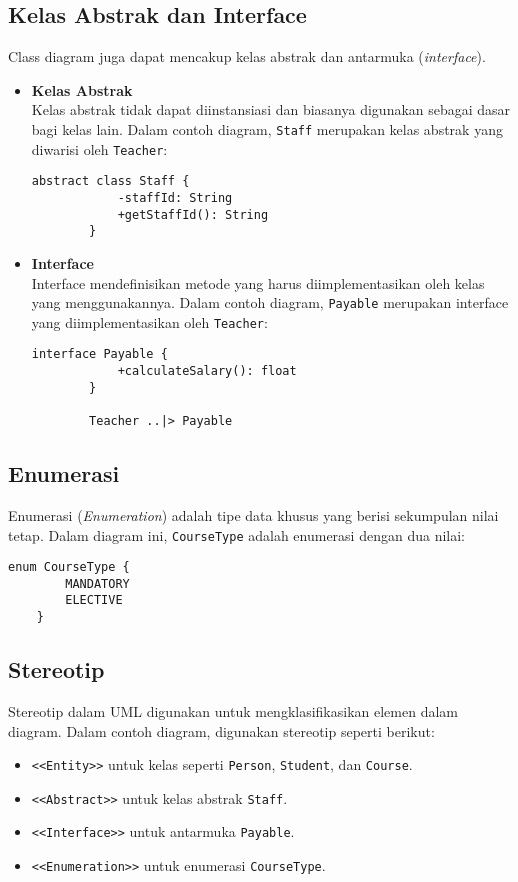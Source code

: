 \subsection{Kelas Abstrak dan Interface}
Class diagram juga dapat mencakup kelas abstrak dan antarmuka (\textit{interface}). 

\begin{itemize}
	\item \textbf{Kelas Abstrak} \\
	Kelas abstrak tidak dapat diinstansiasi dan biasanya digunakan sebagai dasar bagi kelas lain. Dalam contoh diagram, \texttt{Staff} merupakan kelas abstrak yang diwarisi oleh \texttt{Teacher}:
	\begin{lstlisting}[language=puml]
		abstract class Staff {
			-staffId: String
			+getStaffId(): String
		}
	\end{lstlisting}
	
	\item \textbf{Interface} \\
	Interface mendefinisikan metode yang harus diimplementasikan oleh kelas yang menggunakannya. Dalam contoh diagram, \texttt{Payable} merupakan interface yang diimplementasikan oleh \texttt{Teacher}:
	\begin{lstlisting}[language=puml]
		interface Payable {
			+calculateSalary(): float
		}
		
		Teacher ..|> Payable
	\end{lstlisting}
\end{itemize}

\subsection{Enumerasi}
Enumerasi (\textit{Enumeration}) adalah tipe data khusus yang berisi sekumpulan nilai tetap. Dalam diagram ini, \texttt{CourseType} adalah enumerasi dengan dua nilai:
\begin{lstlisting}[language=puml]
	enum CourseType {
		MANDATORY
		ELECTIVE
	}
\end{lstlisting}

\subsection{Stereotip}
Stereotip dalam UML digunakan untuk mengklasifikasikan elemen dalam diagram. Dalam contoh diagram, digunakan stereotip seperti berikut:
\begin{itemize}
	\item \texttt{<<Entity>>} untuk kelas seperti \texttt{Person}, \texttt{Student}, dan \texttt{Course}.
	\item \texttt{<<Abstract>>} untuk kelas abstrak \texttt{Staff}.
	\item \texttt{<<Interface>>} untuk antarmuka \texttt{Payable}.
	\item \texttt{<<Enumeration>>} untuk enumerasi \texttt{CourseType}.
\end{itemize}

